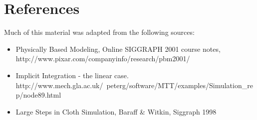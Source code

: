 \documentclass[]{article}
\begin{document}
\section{References}
Much of this material was adapted from the following sources:
\begin{itemize}
\item Physically Based Modeling, Online SIGGRAPH 2001 course notes, http://www.pixar.com/companyinfo/research/pbm2001/ 
\item Implicit Integration - the linear case. http://www.mech.gla.ac.uk/~peterg/software/MTT/examples/Simulation\_rep/node89.html
\item Large Steps in Cloth Simulation, Baraff & Witkin, Siggraph 1998
\end{itemize}
\end{document}
